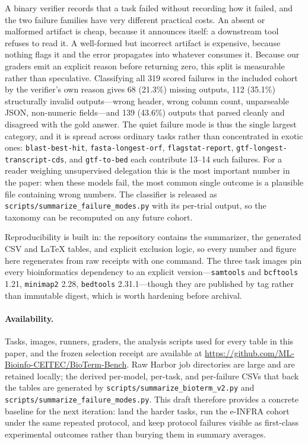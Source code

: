 \documentclass[11pt]{article}
\begin{document}
A binary verifier records that a task failed without recording how it failed, and the two failure families have very different practical costs.
An absent or malformed artifact is cheap, because it announces itself: a downstream tool refuses to read it.
A well-formed but incorrect artifact is expensive, because nothing flags it and the error propagates into whatever consumes it.
Because our graders emit an explicit reason before returning zero, this split is measurable rather than speculative.
Classifying all 319 scored failures in the included cohort by the verifier's own reason gives 68 (21.3\%) missing outputs, 112 (35.1\%) structurally invalid outputs---wrong header, wrong column count, unparseable JSON, non-numeric fields---and 139 (43.6\%) outputs that parsed cleanly and disagreed with the gold answer.
The quiet failure mode is thus the single largest category, and it is spread across ordinary tasks rather than concentrated in exotic ones: \texttt{blast-best-hit}, \texttt{fasta-longest-orf}, \texttt{flagstat-report}, \texttt{gtf-longest-transcript-cds}, and \texttt{gtf-to-bed} each contribute 13--14 such failures.
For a reader weighing unsupervised delegation this is the most important number in the paper: when these models fail, the most common single outcome is a plausible file containing wrong numbers.
The classifier is released as \texttt{scripts/summarize\_failure\_modes.py} with its per-trial output, so the taxonomy can be recomputed on any future cohort.

Reproducibility is built in: the repository contains the summarizer, the generated CSV and \LaTeX{} tables, and explicit exclusion logic, so every number and figure here regenerates from raw receipts with one command.
The three task images pin every bioinformatics dependency to an explicit version---\texttt{samtools} and \texttt{bcftools} 1.21, \texttt{minimap2} 2.28, \texttt{bedtools} 2.31.1---though they are published by tag rather than immutable digest, which is worth hardening before archival.

\paragraph{Availability.}
Tasks, images, runners, graders, the analysis scripts used for every table in this paper, and the frozen selection receipt are available at \url{https://github.com/ML-Bioinfo-CEITEC/BioTerm-Bench}.
Raw Harbor job directories are large and are retained locally; the derived per-model, per-task, and per-failure CSVs that back the tables are generated by \texttt{scripts/summarize\_bioterm\_v2.py} and \texttt{scripts/summarize\_failure\_modes.py}.
This draft therefore provides a concrete baseline for the next iteration: land the harder tasks, run the e-INFRA cohort under the same repeated protocol, and keep protocol failures visible as first-class experimental outcomes rather than burying them in summary averages.
\end{document}
